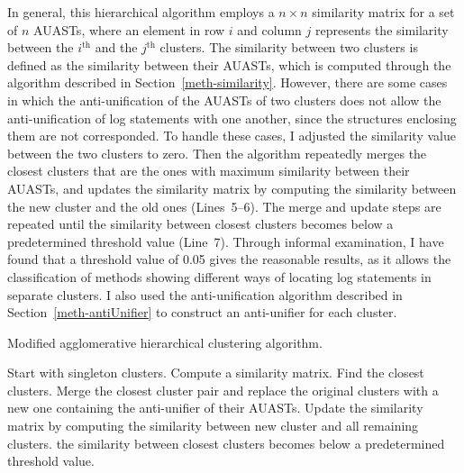 In general, this hierarchical algorithm employs a $n \times n$ similarity matrix for a set of $n$ AUASTs, where an element in row $i$ and column $j$ represents the similarity between the $i^{\text{th}}$ and the $j^{\text{th}}$ clusters. The similarity between two clusters is defined as the similarity between their AUASTs, which is computed through the algorithm described in Section~\ref{meth-similarity}. However, there are some cases in which the anti-unification of the AUASTs of two clusters does not allow the anti-unification of log statements with one another, since the structures enclosing them are not corresponded. To handle these cases, I adjusted the similarity value between the two clusters to zero. Then the algorithm repeatedly merges the closest clusters that are the ones with maximum similarity between their AUASTs, and updates the similarity matrix by computing the similarity between the new cluster and the old ones (Lines~5--6). The merge and update steps are repeated until the similarity between closest clusters becomes below a predetermined threshold value (Line~7). Through informal examination, I have found that a threshold value of 0.05 gives the reasonable results, as it allows the classification of methods showing different ways of locating log statements in separate clusters. I also used the anti-unification algorithm described in Section~\ref{meth-antiUnifier} to construct an anti-unifier for each cluster.



\begin{algorithm}
\caption{Modified agglomerative hierarchical clustering algorithm.} \label{modified-agglomerative}
\begin{algorithmic}[1]
\State Start with singleton clusters.
\State Compute a similarity matrix.
\Repeat
\State Find the closest clusters.
\State Merge the closest cluster pair and replace the original clusters with a new one containing the anti-unifier of their AUASTs.
\State Update the similarity matrix by computing the similarity between new cluster and all remaining clusters.
\Until the similarity between closest clusters becomes below a predetermined threshold value.
\end{algorithmic}
\end{algorithm}


